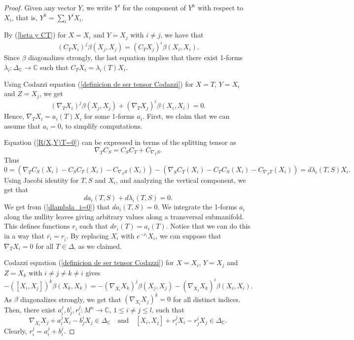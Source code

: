 \documentclass{article}
\theoremstyle{remark}
\begin{document}
\begin{proof}
    Given any vector $Y$, we write $Y^i$ for the component of $Y^h$ with respect to $X_i$, that is, $Y^h=\sum_i Y^i X_i$. 
    
    By (\ref{beta y CT}) for $X=X_i$ and $Y=X_j$ with $i\neq j$, we have that 
    $$(C_T X_i)^j\beta(X_j,X_j)=(C_T X_j)^i\beta(X_i,X_i).$$ 
    Since $\beta$ diagonalizes strongly, the last equation implies that there exist 1-forms $\lambda_i:\Delta_{\mathbb{C}}\rightarrow\mathbb{C}$ such that $C_TX_i=\lambda_i(T)X_i$.
    
    Using Codazzi equation (\ref{definicion de ser tensor Codazzi}) for $X=T$, $Y=X_i$ and $Z=X_j$, we get
    $$(\nabla_TX_i)^j\beta(X_j,X_j)+(\nabla_TX_j)^i\beta(X_i,X_i)=0.$$
    Hence, $\nabla_TX_i=a_i(T)X_i$ for some 1-forms $a_i$. First, we claim that we can assume that $a_i=0$, to simplify computations. 
    
    Equation (\ref{R(X,Y)T=0}) can be expressed in terms of the splitting tensor as
    $$\nabla_T C_S=C_S C_T+C_{\nabla_T S}.$$
    Thus
    \begin{equation}\label{dlambda_i=0}
        0=(\nabla_T C_S(X_i)-C_SC_T(X_i)-C_{\nabla_T S}(X_i))-(\nabla_S C_T(X_i)-C_TC_S(X_i)-C_{\nabla_S T}(X_i))=d\lambda_i(T,S)X_i.
    \end{equation}
    Using Jacobi identity for $T,S$ and $X_i$, and analyzing the vertical component, we get that
    \begin{equation*}
        da_i(T,S)+d\lambda_i(T,S)=0.
    \end{equation*}
    We get from (\ref{dlambda_i=0}) that $da_i(T,S)=0$. We integrate the 1-forms $a_i$ along the nullity leaves giving arbitrary values along a transversal submanifold. This defines functions $r_i$ such that $dr_i(T)=a_i(T)$. Notice that we can do this in a way that $\overline{r_i}=r_{\overline{i}}$. By replacing $X_i$ with $e^{-r_i}X_i$, we can suppose that $\nabla_T X_i=0$ for all $T\in\Delta$, as we claimed.
    
    Codazzi equation (\ref{definicion de ser tensor Codazzi}) for $X=X_i$, $Y=X_j$ and $Z=X_k$ with $i\neq j\neq k\neq i$ gives
    $$-([X_i,X_j])^k\beta(X_k,X_k)=-(\nabla_{X_i}X_k)^j\beta(X_j,X_j)-(\nabla_{X_j}X_k)^i\beta(X_i,X_i).$$
    As $\beta$ diagonalizes strongly, we get that $(\nabla_{X_i}X_j)^k=0$ for all distinct indices. Then, there exist $a_{i}^j,b_{j}^i,r_{i}^j:M^n\rightarrow \mathbb{C}$, $1\leq i\neq j\leq l$, such that
    \begin{equation}\label{ai bi ri}
        \nabla_{X_i}X_j+a_{i}^jX_i-b_{j}^iX_j\in\Delta_\mathbb{C} \quad\text{and}\quad [X_i,X_j]+r_{i}^jX_i-r_{j}^iX_j\in\Delta_\mathbb{C}.
    \end{equation}
    Clearly, $r_{i}^j=a_{i}^j+b_{i}^j$. 
    

\end{proof}
\end{document}
